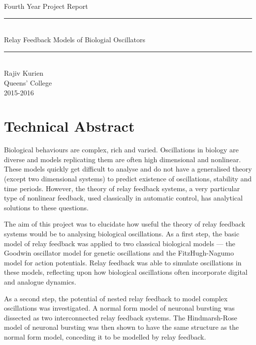 \documentclass[a4paper, 12pt]{article}
\begin{document}
\begin{titlepage}
 \vspace*{\fill}
	\begin{center}
		{\Large Fourth Year Project Report} \vspace{0.25cm}
		\rule{\textwidth}{.1pt} \\[0.25cm]
		{\Huge Relay Feedback Models of Biologial Oscillators}\\%
		\vspace{0.25cm} 
		\rule{\textwidth}{.1pt} \\[0.5cm]
		\Large{
	Rajiv Kurien\\Queens' College\\2015-2016
		}
	\end{center}
 \vspace*{\fill}
\end{titlepage}
\section*{Technical Abstract}

\hspace{0.5cm} Biological behaviours are complex, rich and varied. Oscillations in biology are diverse and models replicating them are often high dimensional and nonlinear. These models quickly get difficult to analyse and do not have a generalised theory (except two dimensional systems) to predict existence of oscillations, stability and time periods. However, the theory of relay feedback systems, a very particular type of nonlinear feedback, used classically in automatic control, has analytical solutions to these questions. 

The aim of this project was to elucidate how useful the theory of relay feedback systems would be to analysing biological oscillations. As a first step, the basic model of relay feedback was applied to two classical biological models --- the Goodwin oscillator model for genetic oscillations and the FitzHugh-Nagumo model for action potentials. Relay feedback was able to simulate oscillations in these models, reflecting upon how biological oscillations often incorporate digital and analogue dynamics. 

As a second step, the potential of nested relay feedback to model complex oscillations was investigated. A normal form model of neuronal bursting was dissected as two interconnected relay feedback systems. The Hindmarsh-Rose model of neuronal bursting was then shown to have the same structure as the normal form model, conceding it to be modelled by relay feedback. 
\end{document}
